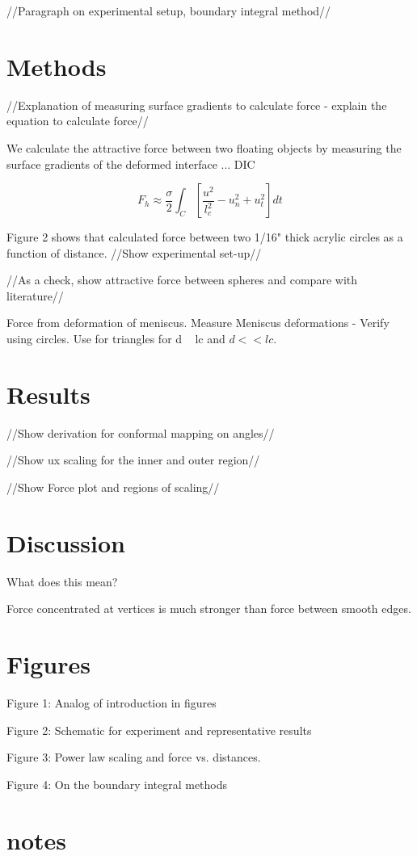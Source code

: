 \documentclass[twocolumn,prl]{revtex4-1}
\begin{document}
//Paragraph on experimental setup, boundary integral method//
	 

\section{Methods}
//Explanation of measuring surface gradients to calculate force - explain the equation to calculate force//

We calculate the attractive force between two floating objects by measuring the surface gradients of the deformed interface ... DIC

\begin{equation}
F_h \approx \frac{\sigma}{2} \int _C [\frac{u^2}{l_c^2}- u_n^2 +u_t^2] dt
\end{equation}

Figure 2 shows that calculated force between two 1/16" thick acrylic circles as a function of distance.
//Show experimental set-up//

//As a check, show attractive force between spheres and compare with literature//

Force from deformation of meniscus. Measure Meniscus deformations - Verify using circles. Use for triangles for d ~ lc and $d << lc$.

\section{Results}
//Show derivation for conformal mapping on angles//

//Show ux scaling for the inner and outer region//

//Show Force plot and regions of scaling//

\section{Discussion}
What does this mean?

Force concentrated at vertices is much stronger than force between smooth edges.

\section{Figures}
Figure 1: Analog of introduction in figures

Figure 2: Schematic for experiment and representative results 

Figure 3: Power law scaling and force vs. distances.

Figure 4: On the boundary integral methods

\section{notes}




\end{document}
